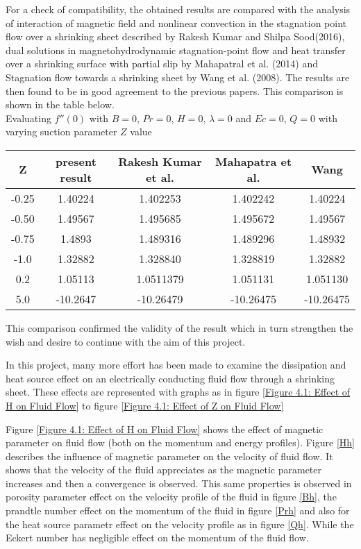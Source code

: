 \documentclass[a4paper,12pt]{report}
\begin{document}
{For a check of compatibility, the obtained results are compared with the analysis of interaction of magnetic field and nonlinear convection in the stagnation point flow over a shrinking sheet described by Rakesh Kumar and Shilpa Sood(2016), dual solutions in magnetohydrodynamic stagnation-point flow and heat transfer over a shrinking surface with partial slip by Mahapatral et al. (2014) and Stagnation flow towards a shrinking sheet by Wang et al. (2008). The results are then found to be in good agreement to the previous papers. This comparison is shown in the table below.\\
Evaluating $f''(0)$ with $B = 0$, $Pr = 0$, $H = 0$, $\lambda = 0$ and $Ec =0$, $Q = 0$ with varying suction parameter $Z$ value
\begin{center}
\begin{tabular}{ | c | c | c | c | c | }
\hline
Z & present result & Rakesh Kumar et al. & Mahapatra et al. & Wang\\
\hline
-0.25 & 1.40224 & 1.402253 & 1.402242 & 1.40224 \\
\hline
-0.50 & 1.49567 & 1.495685 & 1.495672 &  1.49567 \\
\hline
-0.75 & 1.4893 & 1.489316 & 1.489296 & 1.48932 \\
\hline
-1.0 & 1.32882 & 1.328840 & 1.328819 & 1.32882 \\
\hline
0.2 & 1.05113 & 1.0511379 & 1.051131 & 1.051130\\
\hline
5.0 & -10.2647 & -10.26479 & -10.26475 & -10.26475\\
\hline 
\end{tabular}
\end{center}


This comparison confirmed the validity of the result which in turn strengthen the wish and desire to continue with the aim of this project.

In this project, many more effort has been made to examine the dissipation and heat source effect on an electrically conducting fluid flow through a shrinking sheet. These effects are represented with graphs as in figure \ref{Figure 4.1: Effect of H on Fluid Flow} to figure \ref{Figure 4.1: Effect of Z on Fluid Flow}

Figure \ref{Figure 4.1: Effect of H on Fluid Flow} shows the effect of magnetic parameter on fluid flow (both on the momentum and energy profiles). Figure \ref{Hh} describes the influence of magnetic parameter on the velocity of fluid flow. It shows that the velocity of the fluid appreciates as the magnetic parameter increases and then a convergence is observed. This same  properties is observed in  porosity parameter effect on the velocity profile of the fluid in figure \ref{Bh}, the prandtle number effect on the momentum of the fluid in figure \ref{Prh} and also for the heat source parametr effect on the velocity profile as in figure \ref{Qh}. While the Eckert number has negligible effect on the momentum of the fluid flow.

}
\end{document}
